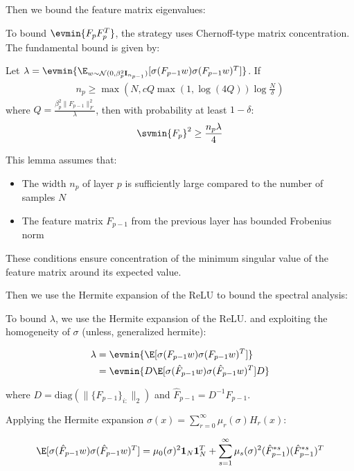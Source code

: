 Then we bound the feature matrix eigenvalues:

To bound $\evmin{F_p F_p^T}$, the strategy uses Chernoff-type matrix concentration. The fundamental bound is given by:
\begin{lemma}
Let $\lambda = \evmin{\E_{w \sim \mathcal{N}(0, \beta_p^2 \mathbf{I}_{n_{p-1}})}[\sigma(F_{p-1}w)\sigma(F_{p-1}w)^T]}$. If 
\begin{align}
n_p \geq \max\left(N, c Q \max(1, \log(4Q)) \log\frac{N}{\delta}\right)
\end{align}
where $Q = \frac{\beta_p^2 \|F_{p-1}\|_F^2}{\lambda}$, then with probability at least $1-\delta$:
\begin{align}
\svmin{F_p}^2 \geq \frac{n_p \lambda}{4}
\end{align}

This lemma assumes that:
\begin{itemize}
\item The width $n_p$ of layer $p$ is sufficiently large compared to the number of samples $N$
\item The feature matrix $F_{p-1}$ from the previous layer has bounded Frobenius norm
\end{itemize}
These conditions ensure concentration of the minimum singular value of the feature matrix around its expected value.
\end{lemma}

Then we use the Hermite expansion of the ReLU to bound the spectral analysis:

To bound $\lambda$, we use the Hermite expansion of the ReLU. and exploiting the homogeneity of $\sigma$ (unless, generalized hermite):

\begin{align}
\lambda &= \evmin{\E[\sigma(F_{p-1}w)\sigma(F_{p-1}w)^T]} \\
&= \evmin{D \E[\sigma(\hat{F}_{p-1}w)\sigma(\hat{F}_{p-1}w)^T] D}
\end{align}

where $D = \text{diag}(\|\{F_{p-1}\}_{i:}\|_2)$ and $\hat{F}_{p-1} = D^{-1}F_{p-1}$.

Applying the Hermite expansion $\sigma(x) = \sum_{r=0}^{\infty} \mu_r(\sigma) H_r(x)$:

\begin{align}
\E[\sigma(\hat{F}_{p-1}w)\sigma(\hat{F}_{p-1}w)^T] = \mu_0(\sigma)^2 \mathbf{1}_N \mathbf{1}_N^T + \sum_{s=1}^{\infty} \mu_s(\sigma)^2 (\hat{F}_{p-1}^{*s})(\hat{F}_{p-1}^{*s})^T
\end{align}

